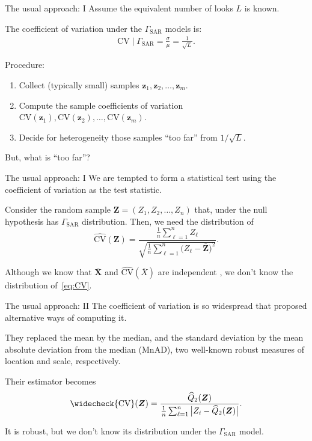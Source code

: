 \documentclass[table,aspectratio=169]{beamer}
\begin{document}
\begin{frame}{The usual approach: I}
Assume the equivalent number of looks $L$ is known.

The coefficient of variation under the $\Gamma_{\text{SAR}}$ models is:
\begin{align}
	\text{CV}\mid \Gamma_{\text{SAR}} =
	\frac{\sigma}{\mu} =
	 \frac{1}{\sqrt{L}}.
\end{align}

Procedure:
\begin{enumerate}
	\item Collect (typically small) samples $\bm z_1, \bm z_2, \dots, \bm z_m$.
	\item Compute the sample coefficients of variation $\text{CV}(\bm z_1),\text{CV}(\bm z_2), \dots, \text{CV}(\bm z_m)$.
	\item Decide for heterogeneity those samples ``too far'' from $1/\sqrt{L}$.
\end{enumerate}

But, what is ``too far''?
\end{frame}


\begin{frame}{The usual approach: I}
We are tempted to form a statistical test using the coefficient of variation as the test statistic.

Consider the random sample $\bm Z=(Z_1,Z_2,\dots,Z_n)$ that, under the null hypothesis has $\Gamma_{\text{SAR}}$ distribution.
Then, we need the distribution of
\begin{equation}
\widehat{\text{CV}}(\bm Z) = \frac{\frac1n \sum_{\ell=1}^n Z_\ell}{\sqrt{\frac1n \sum_{\ell=1}^n \big(Z_\ell-\overline{\bm Z}\big)^2}}.
\label{eq:CV}
\end{equation}

Although we know that $\overline{\bm X}$ and $\widehat{\text{CV}}(\overline X) $ are independent \citep{OnaCharacterizationoftheGammaDistributiontheIndependenceoftheSampleMeanandtheSampleCoefficientofVariation}, we don't know the distribution of~\eqref{eq:CV}.
\end{frame}

\begin{frame}{The usual approach: II}
The coefficient of variation is so widespread that \citet{Ospina2019} proposed alternative ways of computing it.

They replaced the mean by the median, and the standard deviation by the mean absolute deviation from the median (MnAD), two well-known robust measures of location and 
scale, respectively. 

Their estimator becomes
\begin{equation}
\widecheck{\text{CV}}(\bm Z) = \frac{\widehat{Q}_2(\bm Z)}{\frac1n \sum_{\ell=1}^n \big|Z_i-\widehat{Q}_2(\bm Z)\big|}.
\end{equation}

It is robust, but we don't know its distribution under the $\Gamma_{\text{SAR}}$ model.
\end{frame}
\end{document}
